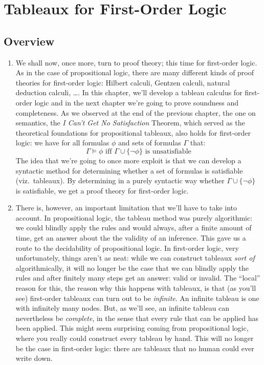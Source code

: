\chapter{Tableaux for First-Order Logic}

\section{Overview}

	\begin{enumerate}[\thesection.1]

	  \item We shall now, once more, turn to proof theory; this time for first-order logic.
		As in the case of propositional logic, there are many different kinds of proof theories for first-order logic: Hilbert calculi, Gentzen calculi, natural deduction calculi, \dots.
		In this chapter, we'll develop a tableau calculus for first-order logic and in the next chapter we're going to prove soundness and completeness.
		As we observed at the end of the previous chapter, the one on semantics, the \emph{I Can't Get No Satisfaction} Theorem, which served as the theoretical foundations for propositional tableaux, also holds for first-order logic: we have for all formulas $\phi$ and sets of formulas $\Gamma$ that:
		\[\Gamma\vDash\phi\text{ iff }\Gamma\cup\{\neg\phi\}\text{ is unsatisfiable}\]
		The idea that we're going to once more exploit is that we can develop a syntactic method for determining whether a set of formulas is satisfiable (viz.\ tableaux).
		By determining in a purely syntactic way whether $\Gamma\cup\{\neg\phi\}$ is satisfiable, we get a proof theory for first-order logic.
		
	  \item There is, however, an important limitation that we'll have to take into account.
		In propositional logic, the tableau method was purely algorithmic: we could blindly apply the rules and would always, after a finite amount of time, get an answer about the the validity of an inference.
		This gave us a route to the decidability of propositional logic.
		In first-order logic, very unfortunately, things aren't as neat: while we can construct tableaux \emph{sort of} algorithmically, it will no longer be the case that we can blindly apply the rules and after finitely many steps get an answer: valid or invalid.
		The ``local'' reason for this, the reason why this happens with tableaux, is that (as you'll see) first-order tableaux can turn out to be \emph{infinite}.
		An infinite tableau is one with infinitely many nodes.
		But, as we'll see, an infinite tableau can nevertheless be \emph{complete}, in the sense that every rule that can be applied has been applied.
		This might seem surprising coming from propositional logic, where you really could construct every tableau by hand.
		This will no longer be the case in first-order logic: there are tableaux that no human could ever write down.


\end{enumerate}
